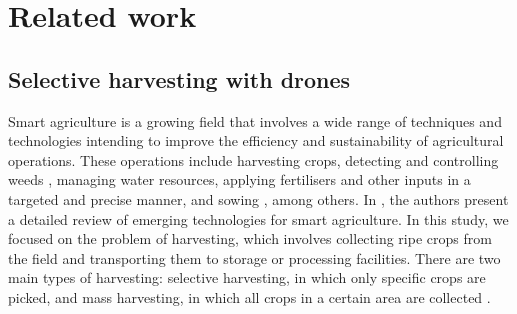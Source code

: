 \documentclass[letterpaper,twocolumn,10pt]{article}
\begin{document}
\section{Related work}
\label{sec:2}

\subsection*{Selective harvesting with drones}
Smart agriculture is a growing field that involves a wide range of techniques and technologies intending to improve the efficiency and sustainability of agricultural operations. These operations include harvesting crops, detecting and controlling weeds \cite{Gondchawar2016IoTBS}, managing water resources, applying fertilisers \cite{Gondchawar2016IoTBS, GonzlezDeSantos2017FleetsOR} and other inputs in a targeted and precise manner, and sowing \cite{7793638}, among others. In \cite{9374808}, the authors present a detailed review of emerging technologies for smart agriculture. In this study, we focused on the problem of harvesting, which involves collecting ripe crops from the field and transporting them to storage or processing facilities. There are two main types of harvesting: selective harvesting, in which only specific crops are picked, and mass harvesting, in which all crops in a certain area are collected \cite{e47335bdec694548b75225d317700e43}.
\end{document}
